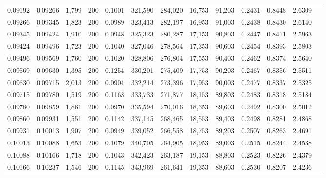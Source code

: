 \begin{tabular}{rrrrrrrrrrrrr}
0.09192 & 0.09266 &  1,799 & 200 &                                     0.1001 & 321,590 & 284,020 &  16,753 &  91,203 & 0.2431 & 0.8448 & 2.6309 \\
0.09266 & 0.09345 &  1,823 & 200 &                                     0.0989 & 323,413 & 282,197 &  16,953 &  91,003 & 0.2438 & 0.8430 & 2.6140 \\
0.09345 & 0.09424 &  1,910 & 200 &                                     0.0948 & 325,323 & 280,287 &  17,153 &  90,803 & 0.2447 & 0.8411 & 2.5963 \\
0.09424 & 0.09496 &  1,723 & 200 &                                     0.1040 & 327,046 & 278,564 &  17,353 &  90,603 & 0.2454 & 0.8393 & 2.5803 \\
0.09496 & 0.09569 &  1,760 & 200 &                                     0.1020 & 328,806 & 276,804 &  17,553 &  90,403 & 0.2462 & 0.8374 & 2.5640 \\
0.09569 & 0.09630 &  1,395 & 200 &                                     0.1254 & 330,201 & 275,409 &  17,753 &  90,203 & 0.2467 & 0.8356 & 2.5511 \\
0.09630 & 0.09715 &  2,013 & 200 &                                     0.0904 & 332,214 & 273,396 &  17,953 &  90,003 & 0.2477 & 0.8337 & 2.5325 \\
0.09715 & 0.09780 &  1,519 & 200 &                                     0.1163 & 333,733 & 271,877 &  18,153 &  89,803 & 0.2483 & 0.8318 & 2.5184 \\
0.09780 & 0.09859 &  1,861 & 200 &                                     0.0970 & 335,594 & 270,016 &  18,353 &  89,603 & 0.2492 & 0.8300 & 2.5012 \\
0.09860 & 0.09931 &  1,551 & 200 &                                     0.1142 & 337,145 & 268,465 &  18,553 &  89,403 & 0.2498 & 0.8281 & 2.4868 \\
0.09931 & 0.10013 &  1,907 & 200 &                                     0.0949 & 339,052 & 266,558 &  18,753 &  89,203 & 0.2507 & 0.8263 & 2.4691 \\
0.10013 & 0.10088 &  1,653 & 200 &                                     0.1079 & 340,705 & 264,905 &  18,953 &  89,003 & 0.2515 & 0.8244 & 2.4538 \\
0.10088 & 0.10166 &  1,718 & 200 &                                     0.1043 & 342,423 & 263,187 &  19,153 &  88,803 & 0.2523 & 0.8226 & 2.4379 \\
0.10166 & 0.10237 &  1,546 & 200 &                                     0.1145 & 343,969 & 261,641 &  19,353 &  88,603 & 0.2530 & 0.8207 & 2.4236 \\

\end{tabular}
